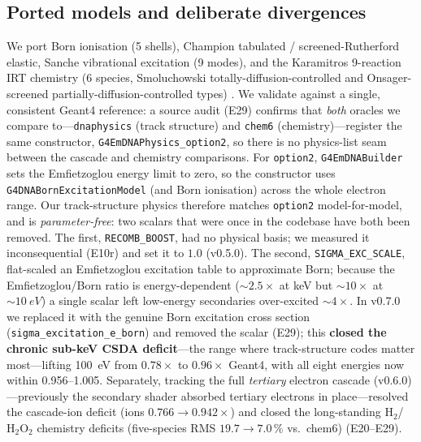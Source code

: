 \documentclass[11pt]{article}
\begin{document}
\subsection{Ported models and deliberate divergences}
We port Born ionisation (5 shells), Champion tabulated / screened-Rutherford
elastic, Sanche vibrational excitation (9 modes), and the Karamitros 9-reaction
IRT chemistry (6 species, Smoluchowski totally-diffusion-controlled and
Onsager-screened partially-diffusion-controlled types)
\cite{karamitros2011,karamitros2014}. We validate against a single, consistent
Geant4 reference: a source audit (E29) confirms that \emph{both} oracles we
compare to---\texttt{dnaphysics} (track structure) and \texttt{chem6}
(chemistry)---register the same constructor, \texttt{G4EmDNAPhysics\_option2},
so there is no physics-list seam between the cascade and chemistry comparisons.
For \texttt{option2}, \texttt{G4EmDNABuilder} sets the Emfietzoglou energy limit
to zero, so the constructor uses \texttt{G4DNABornExcitationModel} (and Born
ionisation) across the whole electron range. Our track-structure physics
therefore matches \texttt{option2} model-for-model, and is \emph{parameter-free}:
two scalars that were once in the codebase have both been removed. The first,
\texttt{RECOMB\_BOOST}, had no physical basis; we measured it inconsequential
(E10r) and set it to $1.0$ (v0.5.0). The second, \texttt{SIGMA\_EXC\_SCALE},
flat-scaled an Emfietzoglou excitation table to approximate Born; because the
Emfietzoglou/Born ratio is energy-dependent ($\sim2.5\times$ at \si{keV} but
$\sim10\times$ at ${\sim}\SI{10}{eV}$) a single scalar left low-energy secondaries
over-excited ${\sim}4\times$. In v0.7.0 we replaced it with the genuine Born
excitation cross section (\texttt{sigma\_excitation\_e\_born}) and removed the
scalar (E29); this \textbf{closed the chronic sub-keV CSDA deficit}---the range
where track-structure codes matter most---lifting \SI{100}{eV} from
$0.78\times$ to $0.96\times$ Geant4, with all eight energies now within
\numrange{0.956}{1.005}. Separately, tracking the full \emph{tertiary} electron
cascade (v0.6.0)---previously the secondary shader absorbed tertiary electrons in
place---resolved the cascade-ion deficit (ions $0.766\to0.942\times$) and closed
the long-standing $\mathrm{H_2}$/$\mathrm{H_2O_2}$ chemistry deficits
(five-species RMS $19.7\to7.0\,\%$ vs.\ chem6) (E20--E29).
\end{document}

